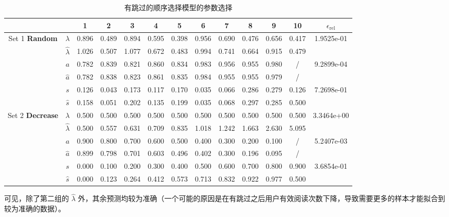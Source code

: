 \documentclass[UTF8]{ctexart}
\theoremstyle{plain}
\theoremstyle{definition}
\theoremstyle{remark}
\begin{document}
	\begin{table}[h!]
		\tiny
		\centering
		\label{tab:meituan-param}
		\begin{tabular}{cc|cccccccccc|c}
			\hline
			&                                         & 1 & 2 & 3 & 4 & 5 & 6 & 7 & 8 & 9 & 10 & $\epsilon_{\text{rel}}$\\
			\hline
			\multirow{4}{*}{Set 1 \textbf{Random}}
			& $\lambda$       & 0.896 & 0.489 & 0.894 & 0.595 & 0.398 & 0.956 & 0.690 & 0.476 & 0.656 & 0.417 & \multirow{2}{*}{1.9525e-01} \\
			& $\hat{\lambda}$ & 1.026 & 0.507 & 1.077 & 0.672 & 0.483 & 0.994 & 0.741 & 0.664 & 0.915 & 0.479 & \\
			& $a$             & 0.782 & 0.839 & 0.821 & 0.860 & 0.834 & 0.983 & 0.956 & 0.955 & 0.980 & \slash& \multirow{2}{*}{9.2899e-04} \\
			& $\hat{a}$       & 0.782 & 0.838 & 0.823 & 0.861 & 0.835 & 0.984 & 0.955 & 0.955 & 0.979 & \slash& \\
			& $s$             & 0.126 & 0.043 & 0.173 & 0.117 & 0.170 & 0.035 & 0.066 & 0.286 & 0.279 & 0.126 & \multirow{2}{*}{7.2698e-01} \\
			& $\hat{s}$       & 0.158 & 0.051 & 0.202 & 0.135 & 0.199 & 0.035 & 0.068 & 0.297 & 0.285 & 0.500 & \\
			\hline
			\multirow{4}{*}{Set 2 \textbf{Decrease}}
			& $\lambda$       & 0.500 & 0.500 & 0.500 & 0.500 & 0.500 & 0.500 & 0.500 & 0.500 & 0.500 & 0.500 & \multirow{2}{*}{3.3464e+00} \\
			& $\hat{\lambda}$ & 0.500 & 0.557 & 0.631 & 0.709 & 0.835 & 1.018 & 1.242 & 1.663 & 2.630 & 5.095 & \\
			& $a$             & 0.900 & 0.800 & 0.700 & 0.600 & 0.500 & 0.400 & 0.300 & 0.200 & 0.100 & \slash& \multirow{2}{*}{5.2407e-03} \\
			& $\hat{a}$       & 0.899 & 0.798 & 0.701 & 0.603 & 0.496 & 0.402 & 0.300 & 0.196 & 0.095 & \slash& \\
			& $s$             & 0.000 & 0.100 & 0.200 & 0.300 & 0.400 & 0.500 & 0.600 & 0.700 & 0.800 & 0.900 & \multirow{2}{*}{3.6854e-01} \\
			& $\hat{s}$       & 0.000 & 0.123 & 0.264 & 0.412 & 0.573 & 0.713 & 0.832 & 0.922 & 0.977 & 0.500 & \\
			\hline
		\end{tabular}
		\caption{有跳过的顺序选择模型的参数选择}
	\end{table}
	\normalsize
	
	可见，除了第二组的 $\hat{\lambda}$ 外，其余预测均较为准确（一个可能的原因是在有跳过之后用户有效阅读次数下降，导致需要更多的样本才能拟合到较为准确的数据）。
	
\end{document}
